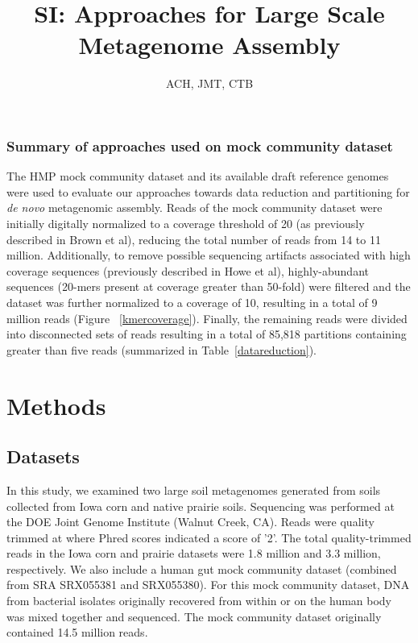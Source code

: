 \documentclass[11pt]{article} %
\begin{document}
\title{SI:  Approaches for Large Scale Metagenome Assembly}
\author{ACH, JMT, CTB}
\maketitle

\subsubsection{Summary of approaches used on mock community dataset}

The HMP mock community dataset and its available draft reference genomes were used to evaluate our approaches towards data reduction and partitioning for \emph{de novo} metagenomic assembly.   Reads of the mock community dataset were initially digitally normalized to a coverage threshold of 20 (as previously described in Brown et al), reducing the total number of reads from 14 to 11 million.  Additionally, to remove possible sequencing artifacts associated with high coverage sequences (previously described in Howe et al), highly-abundant sequences (20-mers present at coverage greater than 50-fold) were filtered and the dataset was further normalized to a coverage of 10, resulting in a total of 9 million reads (Figure ~\ref{kmercoverage}).  Finally, the remaining reads were divided into disconnected sets of reads resulting in a total of 85,818 partitions containing greater than five reads (summarized in Table~\ref{datareduction}).

\section{Methods}

\subsection{Datasets}
In this study, we examined two large soil metagenomes generated from soils collected from Iowa corn and native prairie soils.  Sequencing was performed at the DOE Joint Genome Institute (Walnut Creek, CA).   Reads were quality trimmed at where Phred scores indicated a score of '2'.  The total quality-trimmed reads in the Iowa corn and prairie datasets were 1.8 million and 3.3 million, respectively.  We also include a human gut mock community dataset (combined from SRA SRX055381 and SRX055380).  For this mock community dataset, DNA from bacterial isolates originally recovered from within or on the human body was mixed together and sequenced.  The mock community dataset originally contained 14.5 million reads.  
\end{document}
